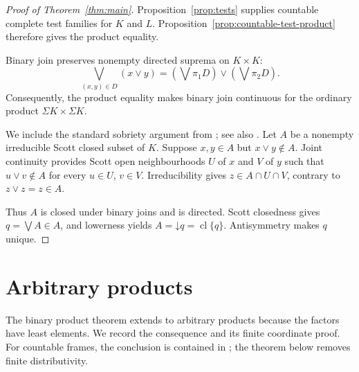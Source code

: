 \documentclass[preprint,11pt]{elsarticle}
\theoremstyle{definition}
\theoremstyle{remark}
\numberwithin{equation}{section}
\newcommand{\down}[1]{\mathord{\downarrow}#1}
\newcommand{\Sig}{\Sigma}
\newcommand{\jc}{\vee}
\newcommand{\cl}{\operatorname{cl}}
\begin{document}
\begin{proof}[Proof of Theorem~\ref{thm:main}]
Proposition~\ref{prop:tests} supplies countable complete test families for $K$ and $L$. Proposition~\ref{prop:countable-test-product} therefore gives the product equality.

Binary join preserves nonempty directed suprema on $K\times K$:
\begin{equation}\label{eq:joinsup}
 \bigvee_{(x,y)\in D}(x\jc y)
 =\left(\bigvee\pi_1D\right)\jc\left(\bigvee\pi_2D\right).
\end{equation}
Consequently, the product equality makes binary join continuous for the ordinary product $\Sig K\times\Sig K$.

We include the standard sobriety argument from \cite[Proposition~5.1]{LawsonXu}; see also \cite[Section~6]{Hertling}. Let $A$ be a nonempty irreducible Scott closed subset of $K$. Suppose $x,y\in A$ but $x\jc y\notin A$. Joint continuity provides Scott open neighbourhoods $U$ of $x$ and $V$ of $y$ such that $u\jc v\notin A$ for every $u\in U$, $v\in V$. Irreducibility gives $z\in A\cap U\cap V$, contrary to $z\jc z=z\in A$.

Thus $A$ is closed under binary joins and is directed. Scott closedness gives $q=\bigvee A\in A$, and lowerness yields $A=\down q=\cl\{q\}$. Antisymmetry makes $q$ unique.
\end{proof}

\section{Arbitrary products}
The binary product theorem extends to arbitrary products because the factors have least elements. We record the consequence and its finite coordinate proof. For countable frames, the conclusion is contained in \cite[Corollary~4.4 and Theorem~4.8]{XuFrames}; the theorem below removes finite distributivity.
\end{document}
